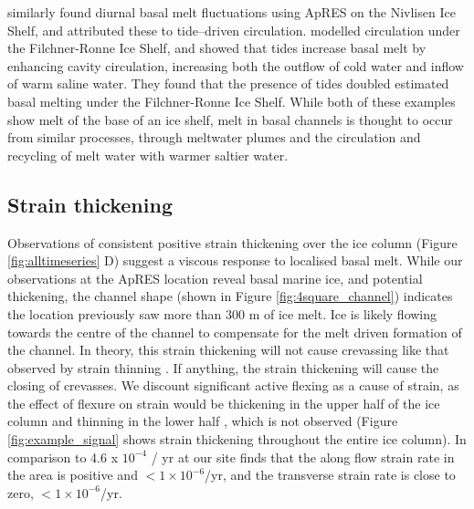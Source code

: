 \cite{lindback2019spatial} similarly found diurnal basal melt fluctuations using ApRES on the Nivlisen Ice Shelf, and attributed these to tide--driven circulation.
\cite{makinson2011influence} modelled circulation under the Filchner-Ronne Ice Shelf, and showed that tides increase basal melt by enhancing cavity circulation, increasing both the outflow of cold water and inflow of warm saline water. They found that the presence of tides doubled estimated basal melting under the Filchner-Ronne Ice Shelf. While both of these examples show melt of the base of an ice shelf, melt in basal channels is thought to occur from similar processes, through meltwater plumes \citep{sergienko2013basal} and the circulation and recycling of melt water with warmer saltier water.
 
 
  
\subsection{Strain thickening} 
 
Observations of consistent positive strain thickening over the ice column (Figure \ref{fig:alltimeseries} D) suggest a viscous response to localised basal melt.  While our observations at the ApRES location reveal basal marine ice, and potential thickening, the channel shape (shown in Figure \ref{fig:4square_channel}) indicates the location previously saw more than 300 m of ice  melt. Ice is likely flowing towards the centre of the channel to compensate for the melt driven formation of the channel.
In theory, this strain thickening will not cause crevassing like that observed by strain thinning \citep[e.g.][]{vaughan2012subglacial}. If anything, the strain thickening will cause the closing of crevasses.
We discount significant active flexing as a cause of strain, as the effect of flexure on strain would be thickening in the upper half of the ice column and  thinning in the lower half \citep{vaughan2012subglacial}, which is not observed (Figure \ref{fig:example_signal} shows strain thickening throughout the entire ice column).
In comparison to 4.6 x $10^{-4}$ / yr at our site \cite{alley2018continent} finds that the along flow strain rate in the area is positive and $< 1 \times 10 ^{-6}$/yr, and the transverse strain rate is close to zero, $< 1 \times 10 ^{-6}$/yr.

